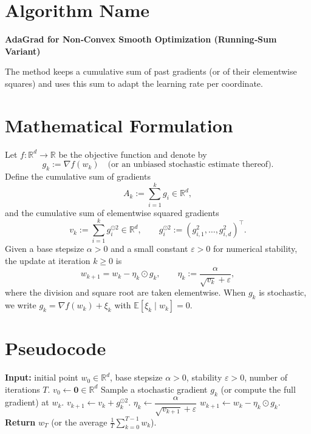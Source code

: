 \documentclass{article}
\newcommand{\E}{\mathbb{E}}
\newcommand{\R}{\mathbb{R}}
\newcommand{\grad}{\nabla}
\begin{document}
\section*{Algorithm Name}
\textbf{AdaGrad for Non‑Convex Smooth Optimization (Running‑Sum Variant)}  

The method keeps a cumulative sum of past gradients (or of their elementwise squares) and uses this sum to adapt the learning rate per coordinate.

\vspace{0.5em}
\section*{Mathematical Formulation}
Let $f:\R^{d}\to\R$ be the objective function and denote by
\[
g_{k}:=\grad f(w_{k})\quad\text{(or an unbiased stochastic estimate thereof).}
\]
Define the cumulative sum of gradients
\[
A_{k}:=\sum_{i=1}^{k} g_{i}\in\R^{d},
\]
and the cumulative sum of elementwise squared gradients
\[
v_{k}:=\sum_{i=1}^{k} g_{i}^{\odot 2}\in\R^{d},
\qquad
g_{i}^{\odot 2}:=(g_{i,1}^{2},\dots,g_{i,d}^{2})^{\top}.
\]
Given a base stepsize $\alpha>0$ and a small constant $\varepsilon>0$ for numerical stability, the update at iteration $k\ge 0$ is
\begin{equation}
\label{eq:update}
w_{k+1}=w_{k}-\eta_{k}\odot g_{k},
\qquad 
\eta_{k}:=\frac{\alpha}{\sqrt{v_{k}}+\varepsilon},
\end{equation}
where the division and square root are taken elementwise.  
When $g_{k}$ is stochastic, we write $g_{k}=\grad f(w_{k})+\xi_{k}$ with $\E[\xi_{k}\mid w_{k}]=0$.

\vspace{0.5em}
\section*{Pseudocode}
\begin{algorithm}[H]
\caption{AdaGrad (Running‑Sum Variant)}\label{alg:adagrad}
\begin{algorithmic}[1]
\State \textbf{Input:} initial point $w_{0}\in\R^{d}$, base stepsize $\alpha>0$, stability $\varepsilon>0$, number of iterations $T$.
\State $v_{0}\gets \mathbf{0}\in\R^{d}$ 
    \State Sample a stochastic gradient $g_{k}$ (or compute the full gradient) at $w_{k}$.
    \State $v_{k+1}\gets v_{k}+g_{k}^{\odot 2}$.
    \State $\eta_{k}\gets \dfrac{\alpha}{\sqrt{v_{k+1}}+\varepsilon}$ 
    \State $w_{k+1}\gets w_{k}-\eta_{k}\odot g_{k}$.
\EndFor
\State \textbf{Return} $w_{T}$ (or the average $\frac1T\sum_{k=0}^{T-1}w_{k}$).
\end{algorithmic}
\end{algorithm}
\end{document}
